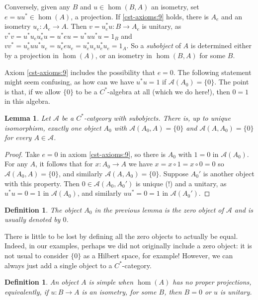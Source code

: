 \documentclass[a4paper,11pt]{article}
\theoremstyle{plain}
\newtheorem{lemma}[proposition]{Lemma}
\newtheorem{definition}[proposition]{Definition}
\theoremstyle{remark}
\newcommand{\mc}[1]{\mathcal{#1}}
\begin{document}
Conversely, given any $B$ and $u\in\hom(B,A)$ an isometry, set $e = uu^* \in \hom(A)$, a projection.  If \ref{cst-axioms:9} holds, there is $A_e$ and an isometry $u_e\colon A_e\to A$.  Then $v = u_e^* u \colon B \to A_e$ is unitary, as $v^*v = u^* u_e u_e^* u = u^* e u = u^* u u^* u = 1_B$ and $vv^* = u_e^* u u^* u_e = u_e^* e u_e = u_e^* u_e u_e^* u_e = 1_A$.  So a \emph{subobject} of $A$ is determined either by a projection in $\hom(A)$, or an isometry in $\hom(B,A)$ for some $B$.

Axiom \ref{cst-axioms:9} includes the possibility that $e=0$.  The following statement might seem confusing, as how can we have $u^*u=1$ if $\mc A(A_0)=\{0\}$.  The point is that, if we allow $\{0\}$ to be a $C^*$-algebra at all (which we do here!), then $0=1$ in this algebra.

\begin{lemma}
Let $\mc A$ be a $C^*$-catgeory with subobjects.  There is, up to unique isomorphism, exactly one object $A_0$ with $\mc A(A_0, A) = \{0\}$ and $\mc A(A,A_0)=\{0\}$ for every $A\in\mc A$.
\end{lemma}
\begin{proof}
Take $e=0$ in axiom \ref{cst-axioms:9}, so there is $A_0$ with $1=0$ in $\mc A(A_0)$.  For any $A$, it follows that for $x\colon A_0 \to A$ we have $x = x\circ 1 = x\circ 0 = 0$ so $\mc A(A_0,A)=\{0\}$, and similarly $\mc A(A,A_0)=\{0\}$.  Suppose $A_0'$ is another object with this property.  Then $0 \in \mc A(A_0, A_0')$ is unique (!) and a unitary, as $u^*u = 0 = 1$ in $\mc A(A_0)$, and similarly $uu^*=0=1$ in $\mc A(A_0')$.
\end{proof}

\begin{definition}\label{defn:zero_obj}
The object $A_0$ in the previous lemma is the \emph{zero object} of $\mc A$ and is usually denoted by $0$.
\end{definition}

There is little to be lost by defining all the zero objects to actually be equal.  Indeed, in our examples, perhaps we did not originally include a zero object: it is not usual to consider $\{0\}$ as a Hilbert space, for example!  However, we can always just add a single object to a $C^*$-category.

\begin{definition}\label{defn:simple_obj}
An object $A$ is \emph{simple} when $\hom(A)$ has no proper projections, equivalently, if $u\colon B\to A$ is an isometry, for some $B$, then $B=0$ or $u$ is unitary.
\end{definition}
\end{document}
